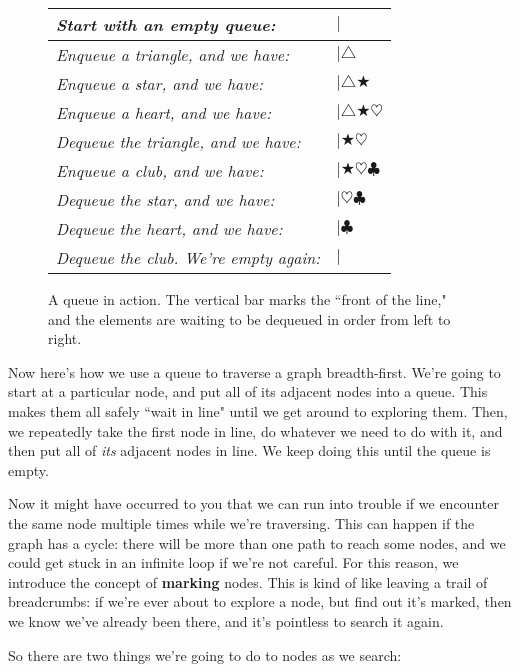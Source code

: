 \afterpage{\clearpage}

\begin{figure}[ht]
\centering
\begin{tabular}{l l}
\textit{Start with an empty queue:} & $|$ \\
\hline
\textit{Enqueue a triangle, and we have:} & $|\triangle$ \\
\hline
\textit{Enqueue a star, and we have:} & $|\triangle \bigstar$ \\
\hline
\textit{Enqueue a heart, and we have:} & $|\triangle \bigstar \heartsuit$ \\
\hline
\textit{Dequeue the triangle, and we have:} & $|\bigstar \heartsuit$ \\
\hline
\textit{Enqueue a club, and we have:} & $|\bigstar \heartsuit \clubsuit$ \\
\hline
\textit{Dequeue the star, and we have:} & $|\heartsuit \clubsuit$ \\
\hline
\textit{Dequeue the heart, and we have:} & $|\clubsuit$ \\
\hline
\textit{Dequeue the club. We're empty again:} & $|$ \\
\end{tabular}
\caption{A queue in action. The vertical bar marks the ``front of the
line," and the elements are waiting to be dequeued in order from left to
right.}
\label{queue}
\end{figure}

Now here's how we use a queue to traverse a graph breadth-first. We're
going to start at a particular node, and put all of its adjacent nodes into
a queue. This makes them all safely ``wait in line" until we get around to
exploring them. Then, we repeatedly take the first node in line, do
whatever we need to do with it, and then put all of \textit{its} adjacent
nodes in line. We keep doing this until the queue is empty.

Now it might have occurred to you that we can run into trouble if we
encounter the same node multiple times while we're traversing. This can
happen if the graph has a cycle: there will be more than one path to reach
some nodes, and we could get stuck in an infinite loop if we're not
careful. For this reason, we introduce the concept of \textbf{marking} 
nodes. This is kind of like leaving a trail of breadcrumbs: if we're ever
about to explore a node, but find out it's marked, then we know we've
already been there, and it's pointless to search it again.

So there are two things we're going to do to nodes as we search:

